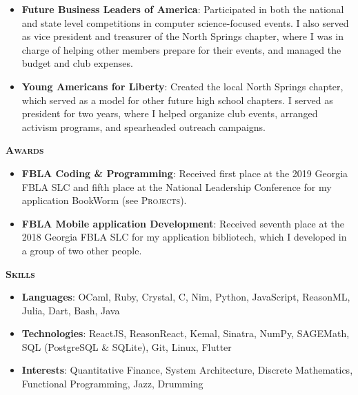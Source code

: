 \documentclass{article}
\begin{document}
  \vspace{3pt}

  \begin{itemize}
    \item \textbf{Future Business Leaders of America}: Participated in both the national and state level competitions in computer science-focused events. I also served as vice president and treasurer of the North Springs chapter, where I was in charge of helping other members prepare for their events, and managed the budget and club expenses.
    \item \textbf{Young Americans for Liberty}: Created the local North Springs chapter, which served as a model for other future high school chapters. I served as president for two years, where I helped organize club events, arranged activism programs, and spearheaded outreach campaigns.
  \end{itemize}

  \vspace{10pt}

  {\large \textbf{\textsc{Awards}}}\hspace{5pt}\xrfill[.5ex]{.4pt}

  \vspace{3pt}

  \begin{itemize}
    \item \textbf{FBLA Coding \& Programming}: Received first place at the 2019 Georgia FBLA SLC and fifth place at the National Leadership Conference for my application BookWorm (see \textsc{Projects}).
    \item \textbf{FBLA Mobile application Development}: Received seventh place at the 2018 Georgia FBLA SLC for my application bibliotech, which I developed in a group of two other people.
  \end{itemize}

  \vspace{10pt}

  {\large \textbf{\textsc{Skills}}}\hspace{5pt}\xrfill[.5ex]{.4pt}

  \vspace{3pt}

  \begin{itemize}
    \item \textbf{Languages}: OCaml, Ruby, Crystal, C, Nim, Python, JavaScript, ReasonML, Julia, Dart, Bash, Java
    \item \textbf{Technologies}: ReactJS, ReasonReact, Kemal, Sinatra, NumPy, SAGEMath, SQL (PostgreSQL \& SQLite), Git, Linux, Flutter
    \item \textbf{Interests}: Quantitative Finance, System Architecture, Discrete Mathematics, Functional Programming, Jazz, Drumming
  \end{itemize}
\end{document}
